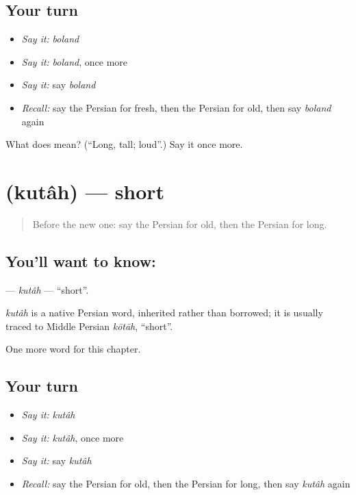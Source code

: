 \subsection*{Your turn}
\begin{itemize}
\raggedright
  \item \emph{Say it:} \emph{boland}
  \item \emph{Say it:} \emph{boland}, once more
  \item \emph{Say it:} say \emph{boland}
  \item \emph{Recall:} say the Persian for fresh, then the Persian for old, then say \emph{boland} again
\end{itemize}

\begin{tcolorbox}[breakable,colback=teal!4,colframe=teal!35!black,title={Before you move on}]
What does  mean? (\textquotedblleft{}Long, tall; loud\textquotedblright{}.) Say it once more.
\end{tcolorbox}
\section[\texorpdfstring{\fa{کوتاه} (kutâh)}{کوتاه (kutâh)}]{ (kutâh) — short}

\label{lesson:FA-C59-kutah}



\begin{quote}
Before the new one: say the Persian for old, then the Persian for long.
\end{quote}

\subsection*{You'll want to know: }
\textbf{} — \emph{kutâh} — \textquotedblleft{}short\textquotedblright{}.

\begin{cousinweb}
\emph{kutâh} is a native Persian word, inherited rather than borrowed; it is usually traced to Middle Persian \emph{kōtāh}, \textquotedblleft{}short\textquotedblright{}.
\end{cousinweb}

\begin{grammarlens}[title={What you've built}]
One more word for this chapter.
\end{grammarlens}

\subsection*{Your turn}
\begin{itemize}
\raggedright
  \item \emph{Say it:} \emph{kutâh}
  \item \emph{Say it:} \emph{kutâh}, once more
  \item \emph{Say it:} say \emph{kutâh}
  \item \emph{Recall:} say the Persian for old, then the Persian for long, then say \emph{kutâh} again
\end{itemize}

